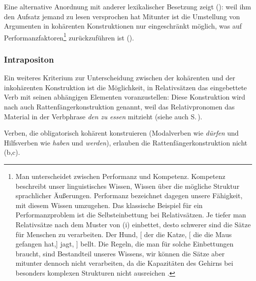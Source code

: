 Eine alternative Anordnung mit anderer lexikalischer Besetzung zeigt ():
\ea 
weil    ihm den Aufsatz jemand   zu lesen versprochen hat
\z
Mitunter ist die Umstellung von Argumenten in kohärenten Konstruktionen nur eingeschränkt möglich,
was auf Performanzfaktoren\footnote{
  Man unterscheidet zwischen Performanz und Kompetenz. Kompetenz beschreibt unser linguistisches
  Wissen, \dash Wissen über die mögliche Struktur sprachlicher Äußerungen. Performanz bezeichnet
  dagegen unsere Fähigkeit, mit diesem Wissen umzugehen. Das klassische Beispiel für ein
  Performanzproblem ist die Selbsteinbettung bei Relativsätzen. Je tiefer man Relativsätze nach dem
  Muster von (i) einbettet, desto schwerer sind die Sätze für Menschen zu verarbeiten.
\ea
Der Hund, [ der die Katze, [ die die Maus gefangen hat,] jagt, ] bellt.
\z
Die Regeln, die man für solche Einbettungen braucht, sind Bestandteil unseres Wissens, wir können
die Sätze aber mitunter dennoch nicht verarbeiten, da die Kapazitäten des Gehirns bei besonders
komplexen Strukturen nicht ausreichen \citep{MC63a-u}.%
} zurückzuführen ist (\citealp[]{BK89a}).%



\subsubsection{Intrapositon}

Ein weiteres Kriterium zur Unterscheidung zwischen der kohärenten und der
inkohärenten Konstruktion ist die Möglichkeit, in Relativsätzen das eingebettete Verb mit
seinen abhängigen Elementen voranzustellen:
\eal
\label{inkohaerenz-rs}
\zl
Diese Konstruktion wird nach \citet*[]{Ross67} 
auch Rattenfängerkonstruktion genannt,
weil das Relativpronomen das Material in der Verbphrase \emph{den zu essen} mitzieht (siehe auch S.\,\pageref{page-rattenfaenger}).

Verben, die obligatorisch kohärent konstruieren (Modalverben wie \emph{dürfen} und Hilfsverben wie
\emph{haben} und \emph{werden}), erlauben die Rattenfängerkonstruktion nicht (b,c). 

